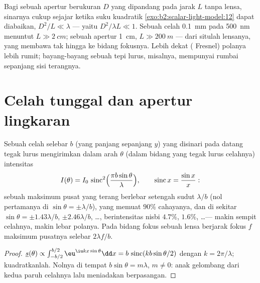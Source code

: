 \begin{remark}\label{rem:b2:diffraction:fresnelnumber}
Bagi sebuah apertur berukuran $D$ yang dipandang pada jarak $L$ tanpa lensa,
sinarnya cukup sejajar ketika suku kuadratik
\cref{exo:b2:scalar-light-model:12} dapat diabaikan, $D^2/L \ll \lambda$ ---
yaitu \emph{} $D^2/\lambda L \ll 1$. Sebuah celah \qty{0.1}{mm} pada
\qty{500}{nm} menuntut $L \gg \qty{2}{cm}$; sebuah apertur \qty{1}{cm}, $L \gg \qty{200}{m}$ ---
dari situlah lensanya, yang membawa tak hingga ke bidang fokusnya. Lebih dekat
( Fresnel) polanya lebih rumit; bayang-bayang sebuah
tepi lurus, misalnya, mempunyai rumbai sepanjang sisi terangnya.
\end{remark}

\section{Celah tunggal dan apertur lingkaran}

\begin{proposition}\label{prop:b2:diffraction:slit}
Sebuah celah selebar $b$ (yang panjang sepanjang $y$) yang disinari pada datang tegak lurus mengirimkan dalam
arah $\theta$ (dalam bidang yang tegak lurus celahnya)
intensitas
\[
I(\theta) = I_0\,\operatorname{sinc}^2\Bigl(\frac{\pi b\sin\theta}\lambda\Bigr) , \qquad \operatorname{sinc}x = \frac{\sin x}x :
\]
sebuah maksimum pusat yang terang berlebar setengah sudut $\lambda/b$ (nol pertamanya di
$\sin\theta = \pm\lambda/b$), yang memuat $90\%$ cahayanya, dan 
di sekitar $\sin\theta = \pm1.43\lambda/b$, $\pm2.46\lambda/b$, \dots, berintensitas
nisbi $4.7\%$, $1.6\%$, \dots --- makin sempit celahnya, makin lebar
polanya. Pada bidang fokus sebuah lensa berjarak fokus $f$
maksimum pusatnya selebar $2\lambda f/b$.
\end{proposition}

\begin{proof}
$\underline s(\theta) \propto \int_{-b/2}^{b/2}\eu^{\iu kx\sin\theta}\dd x = b\,\operatorname{sinc}(kb\sin\theta/2)$
dengan $k = 2\pi/\lambda$; kuadratkanlah. Nolnya di tempat $b\sin\theta = m\lambda$, $m \ne 0$: anak
gelombang dari kedua paruh celahnya lalu meniadakan berpasangan.
\end{proof}

